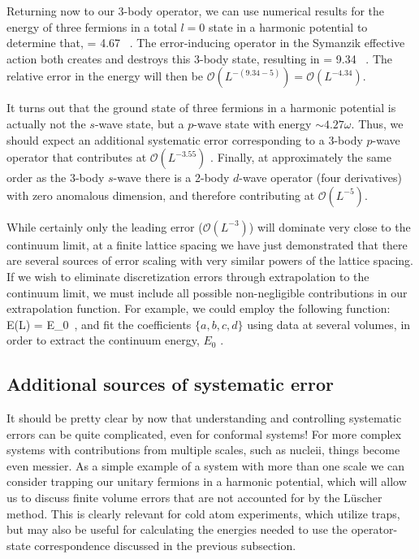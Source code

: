 Returning now to our 3-body operator, we can use numerical results for the energy of three fermions in a total $l=0$ state in a harmonic potential \cite{2007PhRvL..99w3201B,2011CRPhy..12...86B} to determine that,
\beq
\left[\psi\psi\psi\right] = 4.67 \ .
\eeq
The error-inducing operator in the Symanzik effective action both creates and destroys this 3-body state, resulting in
\beq
\left[\left(\psi\psi\psi\right)^{\dagger}\psi\psi\psi\right] = 9.34 \ .
\eeq
The relative error in the energy will then be ${\mathcal{ O}}\left(L^{-(9.34-5)}\right) = {\mathcal{ O}}\left(L^{-4.34}\right)$.

It turns out that the ground state of three fermions in a harmonic potential is actually not the $s$-wave state, but a $p$-wave state with energy $\sim 4.27\omega$. Thus, we should expect an additional systematic error corresponding to a 3-body $p$-wave operator that contributes at ${\mathcal{ O}}\left(L^{-3.55}\right)$ \cite{2006PhRvL..97o0401W}. Finally, at approximately the same order as the 3-body $s$-wave there is a 2-body $d$-wave operator (four derivatives) with zero anomalous dimension, and therefore contributing at ${\mathcal{ O}}\left(L^{-5}\right)$.

While certainly only the leading error (${\mathcal{ O}}\left(L^{-3}\right)$) will dominate very close to the continuum limit, at a finite lattice spacing we have just demonstrated that there are several sources of error scaling with very similar powers of the lattice spacing. If we wish to eliminate discretization errors through extrapolation to the continuum limit, we must include all possible non-negligible contributions in our extrapolation function. For example, we could employ the following function:
\beq
E(L) = E_0 \ ,
\eeq
and fit the coefficients $\{a,b,c,d\}$ using data at several volumes, in order to extract the continuum energy, $E_0$ \cite{EKLN4}.

\subsection{Additional sources of systematic error}
It should be pretty clear by now that understanding and controlling systematic errors can be quite complicated, even for conformal systems! For more complex systems with contributions from multiple scales, such as nucleii, things become even messier. As a simple example of a system with more than one scale we can consider trapping our unitary fermions in a harmonic potential, which will allow us to discuss finite volume errors that are not accounted for by the L\"uscher method. This is clearly relevant for cold atom experiments, which utilize traps, but may also be useful for calculating the energies needed to use the operator-state correspondence discussed in the previous subsection.

